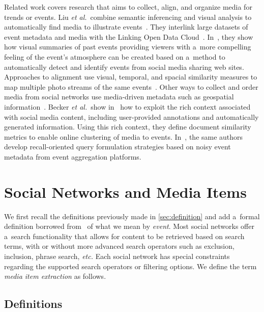 Related work covers research
that aims to collect, align, and organize media
for trends or events.
Liu \emph{et al.}\ combine semantic inferencing and visual analysis
to automatically find media to illustrate
events~\cite{liu2011events}.
They interlink large datasets of event metadata
and media with the Linking Open Data
Cloud~\cite{bizer2011statelodcloud,cyganiak2011lodcloud}.
In~\cite{liu2011socialmedia}, they show how visual summaries
of past events providing viewers with a~more compelling feeling
of the event's atmosphere can be created
based on a~method to automatically detect and identify events
from social media sharing web sites.
Approaches to alignment use visual, temporal,
and spacial similarity measures to map multiple photo streams of
the same events~\cite{yang2011photostream}.
Other ways to collect and order media from social networks use
media-driven metadata such as geospatial
information~\cite{crandall2009mappingphotos}.
Becker \emph{et al.}\ show in~\cite{becker2010eventidentification}
how to exploit the rich context associated with social media
content, including user-provided annotations
and automatically generated information.
Using this rich context, they define document similarity metrics
to enable online clustering of media to events.
In~\cite{becker2012plannedevents}, the same authors develop 
recall-oriented query formulation strategies
based on noisy event metadata
from event aggregation platforms.

\section{Social Networks and Media Items}                                    \label{sec:social-networks}

We first recall the definitions previously made in
\autoref{sec:definition} and add a~formal definition
borrowed from~\cite{liu2011events}
of what we mean by \emph{event}.
Most social networks offer a~search functionality that allows for
content to be retrieved based on search terms,
with or without more advanced search operators
such as exclusion, inclusion, phrase search, \emph{etc.}
Each social network has special constraints
regarding the supported search operators or filtering options.
We define the term \emph{media item extraction}
as follows.

\subsection{Definitions}

